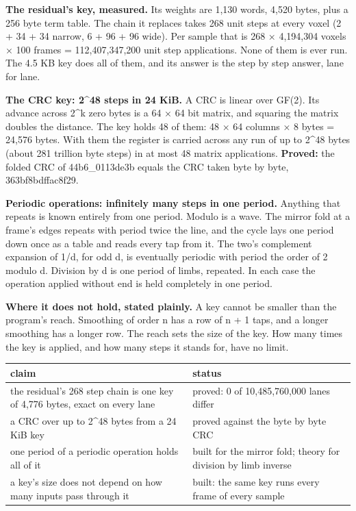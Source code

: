 \textbf{The residual's key, measured.} Its weights are 1,130 words, 4,520 bytes, plus a 256 byte term table. The chain it replaces takes 268 unit steps at every voxel (2 + 34 + 34 narrow, 6 + 96 + 96 wide). Per sample that is 268 × 4,194,304 voxels × 100 frames = 112,407,347,200 unit step applications. None of them is ever run. The 4.5 KB key does all of them, and its answer is the step by step answer, lane for lane.

\textbf{The CRC key: 2\textasciicircum{}48 steps in 24 KiB.} A CRC is linear over GF(2). Its advance across 2\textasciicircum{}k zero bytes is a 64 × 64 bit matrix, and squaring the matrix doubles the distance. The key holds 48 of them: 48 × 64 columns × 8 bytes = 24,576 bytes. With them the register is carried across any run of up to 2\textasciicircum{}48 bytes (about 281 trillion byte steps) in at most 48 matrix applications. \textbf{Proved:} the folded CRC of 44b6\_\allowbreak{}0113de3b equals the CRC taken byte by byte, 363bf8bdffac8f29.

\textbf{Periodic operations: infinitely many steps in one period.} Anything that repeats is known entirely from one period. Modulo is a wave. The mirror fold at a frame's edges repeats with period twice the line, and the cycle lays one period down once as a table and reads every tap from it. The two's complement expansion of 1/d, for odd d, is eventually periodic with period the order of 2 modulo d. Division by d is one period of limbs, repeated. In each case the operation applied without end is held completely in one period.

\textbf{Where it does not hold, stated plainly.} A key cannot be smaller than the program's reach. Smoothing of order n has a row of n + 1 taps, and a longer smoothing has a longer row. The reach sets the size of the key. How many times the key is applied, and how many steps it stands for, have no limit.

{\small
\setlength{\tabcolsep}{6pt}
\begin{longtable}{>{\RaggedRight\arraybackslash}p{}>{\RaggedRight\arraybackslash}p{}}
\toprule
claim & status \\
\midrule
\endhead
the residual's 268 step chain is one key of 4,776 bytes, exact on every lane & proved: 0 of 10,485,760,000 lanes differ \\
a CRC over up to 2\textasciicircum{}48 bytes from a 24 KiB key & proved against the byte by byte CRC \\
one period of a periodic operation holds all of it & built for the mirror fold; theory for division by limb inverse \\
a key's size does not depend on how many inputs pass through it & built: the same key runs every frame of every sample \\
\bottomrule
\end{longtable}
}

